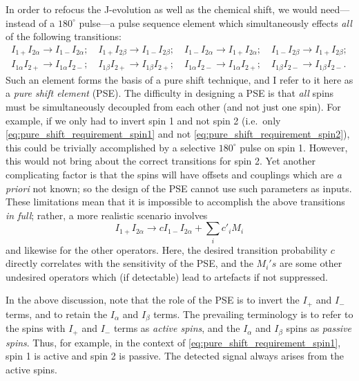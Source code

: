 In order to refocus the J-evolution as well as the chemical shift, we would need---instead of a $180^\circ$ pulse---a pulse sequence element which simultaneously effects \textit{all} of the following transitions:
\begin{align}
    I_{1+}I_{2\alpha} \longrightarrow I_{1-}I_{2\alpha}; \quad I_{1+}I_{2\beta} \longrightarrow I_{1-}I_{2\beta}; \quad
    I_{1-}I_{2\alpha} \longrightarrow I_{1+}I_{2\alpha}; \quad I_{1-}I_{2\beta} \longrightarrow I_{1+}I_{2\beta}; \label{eq:pure_shift_requirement_spin1} \\
    I_{1\alpha}I_{2+} \longrightarrow I_{1\alpha}I_{2-}; \quad I_{1\beta}I_{2+} \longrightarrow I_{1\beta}I_{2+}; \quad
    I_{1\alpha}I_{2-} \longrightarrow I_{1\alpha}I_{2+}; \quad I_{1\beta}I_{2-} \longrightarrow I_{1\beta}I_{2-}. \label{eq:pure_shift_requirement_spin2}
\end{align}
Such an element forms the basis of a pure shift technique, and I refer to it here as a \textit{pure shift element} (PSE).
The difficulty in designing a PSE is that \textit{all} spins must be simultaneously decoupled from each other (and not just one spin).
For example, if we only had to invert spin 1 and not spin 2 (i.e.\ only \cref{eq:pure_shift_requirement_spin1} and not \cref{eq:pure_shift_requirement_spin2}), this could be trivially accomplished by a selective $180^\circ$ pulse on spin 1.
However, this would not bring about the correct transitions for spin 2.
Yet another complicating factor is that the spins will have offsets and couplings which are \textit{a priori} not known; so the design of the PSE cannot use such parameters as inputs.
These limitations mean that it is impossible to accomplish the above transitions \textit{in full}; rather, a more realistic scenario involves
\begin{equation}
    \label{eq:realistic_pse}
    I_{1+}I_{2\alpha} \longrightarrow c I_{1-}I_{2\alpha} + \sum_i c'_i M_i
\end{equation}
and likewise for the other operators.
Here, the desired transition probability $c$ directly correlates with the sensitivity of the PSE, and the $M_i's$ are some other undesired operators which (if detectable) lead to artefacts if not suppressed.

In the above discussion, note that the role of the PSE is to invert the $I_+$ and $I_-$ terms, and to retain the $I_\alpha$ and $I_\beta$ terms.
The prevailing terminology is to refer to the spins with $I_+$ and $I_-$ terms as \textit{active spins}, and the $I_\alpha$ and $I_\beta$ spins as \textit{passive spins}.
Thus, for example, in the context of \cref{eq:pure_shift_requirement_spin1}, spin 1 is active and spin 2 is passive.
The detected signal always arises from the active spins.

